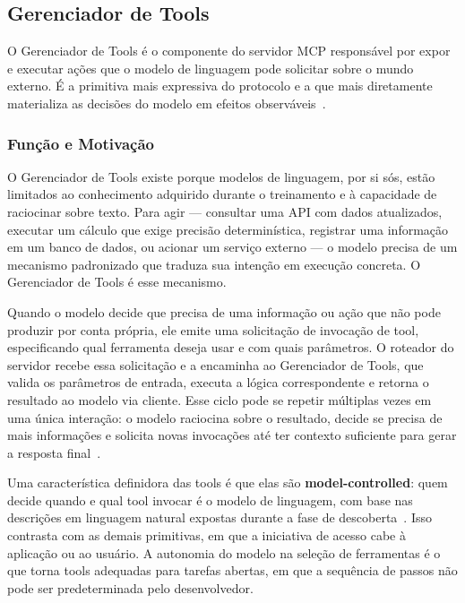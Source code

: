 \documentclass[12pt]{article}
\begin{document}
\subsection{Gerenciador de Tools}
\label{subsec:tool-handler}

O Gerenciador de Tools é o componente do servidor MCP responsável por
expor e executar ações que o modelo de linguagem pode solicitar sobre o
mundo externo. É a primitiva mais expressiva do protocolo e a que mais
diretamente materializa as decisões do modelo em efeitos
observáveis~\cite{mcp2025tools}.

\subsubsection{Função e Motivação}

O Gerenciador de Tools existe porque modelos de linguagem, por si sós,
estão limitados ao conhecimento adquirido durante o treinamento e à
capacidade de raciocinar sobre texto. Para agir --- consultar uma API com
dados atualizados, executar um cálculo que exige precisão determinística,
registrar uma informação em um banco de dados, ou acionar um serviço
externo --- o modelo precisa de um mecanismo padronizado que traduza sua
intenção em execução concreta. O Gerenciador de Tools é esse mecanismo.

Quando o modelo decide que precisa de uma informação ou ação que não pode
produzir por conta própria, ele emite uma solicitação de invocação de
tool, especificando qual ferramenta deseja usar e com quais parâmetros.
O roteador do servidor recebe essa solicitação e a encaminha ao Gerenciador
de Tools, que valida os parâmetros de entrada, executa a lógica
correspondente e retorna o resultado ao modelo via cliente. Esse ciclo
pode se repetir múltiplas vezes em uma única interação: o modelo
raciocina sobre o resultado, decide se precisa de mais informações e
solicita novas invocações até ter contexto suficiente para gerar a
resposta final~\cite{philschmid2025mcp}.

Uma característica definidora das tools é que elas são
\textbf{model-controlled}: quem decide quando e qual tool invocar é o
modelo de linguagem, com base nas descrições em linguagem natural expostas
durante a fase de descoberta~\cite{mcp2025tools}. Isso contrasta com as
demais primitivas, em que a iniciativa de acesso cabe à aplicação ou ao
usuário. A autonomia do modelo na seleção de ferramentas é o que torna
tools adequadas para tarefas abertas, em que a sequência de passos não
pode ser predeterminada pelo desenvolvedor.
\end{document}
